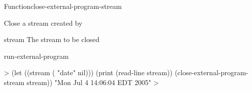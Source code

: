 \documentclass[10pt,twoside,english,pdftex]{article}
\begin{document}

\begin{functiondoc}{Function}{close-external-program-stream}{}
%
%

\fnsyntax

%
\fnpurpose Close a stream created by
\textbf{}

\fnpackage {}

\fnmodule {}

\fnargs
\begin{args}{stream}
\arg[stream] The stream to be closed
\end{args}

\begin{alsos}{run-external-program}
\end{alsos}

%
\fnexample
%
\W\supp
\begin{example}
  > (let ((stream ( "date" nil)))
       (print (read-line stream))
       (close-external-program-stream stream))
  "Mon Jul  4 14:06:04 EDT 2005" 
  >
\end{example}

\end{functiondoc}

\end{document}
